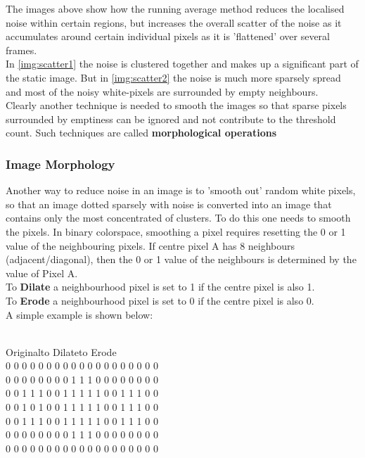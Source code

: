 {{The images above show how the running average method reduces the localised noise within certain regions, but increases the overall scatter of the noise as it accumulates around certain individual pixels as it is 'flattened' over several frames.\\\linebreak
\pagebreak In \cref{img:scatter1} the noise is clustered together and makes up a significant part of the static image. But in \cref{img:scatter2} the noise is much more sparsely spread and most of the noisy white-pixels are surrounded by empty neighbours.\\

Clearly another technique is needed to smooth the images so that sparse pixels surrounded by emptiness can be ignored and not contribute to the threshold count. Such techniques are called {\bf morphological operations}

\subsubsection{Image Morphology}\label{kernelmorph}
Another way to reduce noise in an image is to 'smooth out' random white pixels, so that an image dotted sparsely with noise is converted into an image that contains only the most concentrated of clusters.  To do this one needs to smooth the pixels.
In binary colorspace, smoothing a pixel requires resetting the 0 or 1 value of the neighbouring pixels. If centre pixel A has 8 neighbours (adjacent/diagonal), then the 0 or 1 value of the neighbours is determined by the value of Pixel A.\\
To {\bf Dilate} a neighbourhood pixel is set to 1 if the centre pixel is also 1.\\
To {\bf Erode} a neighbourhood pixel is set to 0 if the centre pixel is also 0.\\
A simple example is shown below:

\begin{center}
\vspace{-20pt}
\begin{frame}{}\\
Original\tab\tab to Dilate\tab to Erode\tab\\
\tiny{
0 0 0 0 0 0 0 \tab{} 0 0 0 0 0 0 \tab{} 0 0 0 0 0 0 \\
0 0 0 0 0 0 0 \tab{} 0 1 1 1 0 0 \tab{} 0 0 0 0 0 0 \\
0 0 1 1 1 0 0 \tab{} 1 1 1 1 1 0 \tab{} 0 1 1 1 0 0 \\
0 0 1 0 1 0 0 \tab{} 1 1 1 1 1 0 \tab{} 0 1 1 1 0 0 \\
0 0 1 1 1 0 0 \tab{} 1 1 1 1 1 0 \tab{} 0 1 1 1 0 0 \\
0 0 0 0 0 0 0 \tab{} 0 1 1 1 0 0 \tab{} 0 0 0 0 0 0 \\
0 0 0 0 0 0 0 \tab{} 0 0 0 0 0 0 \tab{} 0 0 0 0 0 0 \\
}
\end{frame}
\end{center}

}}

